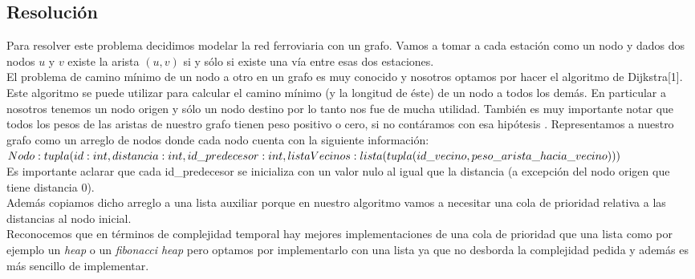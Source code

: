 \subsection{Resoluci\'on}
Para resolver este problema decidimos modelar la red ferroviaria
con un grafo. Vamos a tomar a cada estaci\'on como un nodo y dados dos nodos $u$ y $v$ existe la arista $(u,v)$ si y s\'olo si existe una v\'ia entre esas dos estaciones.\\
El problema de camino m\'inimo de un nodo a otro en un grafo es muy conocido y nosotros optamos por hacer el algoritmo de Dijkstra[1]. Este algoritmo se puede utilizar para calcular el camino m\'inimo (y la longitud de \'este) de un nodo a todos los dem\'as. En particular a nosotros tenemos un nodo origen y s\'olo un nodo destino por lo tanto nos fue de mucha utilidad. Tambi\'en es muy importante notar que todos los pesos de las aristas de nuestro grafo tienen peso positivo o cero, si no contáramos con esa hip\'otesis .
Representamos a nuestro grafo como un arreglo de nodos donde cada nodo cuenta con la siguiente informaci\'on: \\

$Nodo: tupla(id: int, \\
distancia:int, \\
id\_predecesor: int, \\
listaVecinos:lista(tupla(id\_vecino,peso\_arista\_hacia\_vecino)))$\\

Es importante aclarar que cada id\_predecesor se inicializa con un valor nulo al igual que la distancia (a excepci\'on del nodo origen que tiene distancia $0$).\\
Adem\'as copiamos dicho arreglo a una lista auxiliar porque en nuestro algoritmo vamos a necesitar una cola de prioridad relativa a las distancias al nodo inicial. \\
Reconocemos que en t\'erminos de complejidad temporal hay mejores implementaciones de una cola de prioridad que una lista como por ejemplo un \emph{heap} o un \emph{fibonacci heap} pero optamos por implementarlo con una lista ya que no desborda la complejidad pedida y adem\'as es m\'as sencillo de implementar.\\

